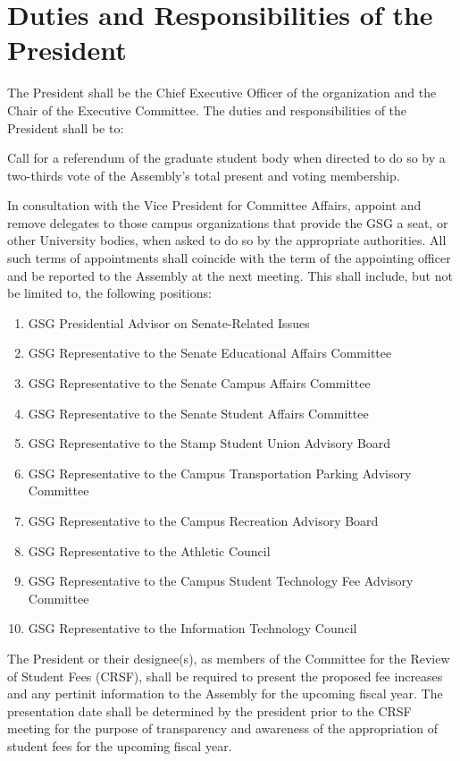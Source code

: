 \section{Duties and Responsibilities of the President}
\begin{bylaws-number}
  \item The President shall be the Chief Executive Officer of the organization and the Chair of the Executive Committee. The duties and responsibilities of the President shall be to:
  \begin{bylaws-number}
    \item Call for a referendum of the graduate student body when directed to do so by a two-thirds vote of the Assembly’s total present and voting membership.
    \item In consultation with the Vice President for Committee Affairs, appoint and remove delegates to those campus organizations that provide the GSG a seat, or other University bodies, when asked to do so by the appropriate authorities. All such terms of appointments shall coincide with the term of the appointing officer and be reported to the Assembly at the next meeting. This shall include, but not be limited to, the following positions:
    \begin{enumerate}[i]
      \item GSG Presidential Advisor on Senate-Related Issues
      \item GSG Representative to the Senate Educational Affairs Committee
      \item GSG Representative to the Senate Campus Affairs Committee
      \item GSG Representative to the Senate Student Affairs Committee
      \item GSG Representative to the Stamp Student Union Advisory Board
      \item GSG Representative to the Campus Transportation Parking Advisory Committee
      \item GSG Representative to the Campus Recreation Advisory Board
      \item GSG Representative to the Athletic Council
      \item GSG Representative to the Campus Student Technology Fee Advisory Committee
      \item GSG Representative to the Information Technology Council
    \end{enumerate}
    \item The President or their designee(s), as members of the Committee for the Review of Student Fees (CRSF), shall be required to present the proposed fee increases and any pertinit information to the Assembly for the upcoming fiscal year. The presentation date shall be determined by the president prior to the CRSF meeting for the purpose of transparency and awareness of the appropriation of student fees for the upcoming fiscal year.

\end{bylaws-number}
\end{bylaws-number}
